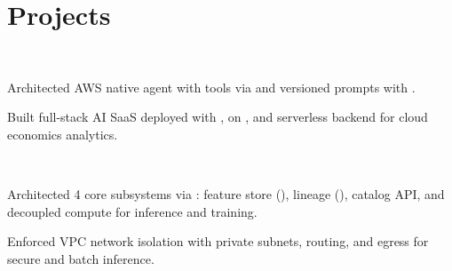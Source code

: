 \documentclass{tex/deedy-resume-openfont}
\begin{document}
\begin{minipage}[t]{0.67\textwidth}

\section{Projects}

\\
\begin{tightemize}
    \item Architected AWS native agent with tools via  and versioned prompts with .
    \item Built full-stack AI SaaS deployed with ,  on , and serverless backend for cloud economics analytics.
\end{tightemize}
\sectionsep

\\
\begin{tightemize}
    \item Architected 4 core subsystems via : feature store (), lineage (), catalog API, and decoupled compute for inference and training.
    \item Enforced VPC network isolation with private subnets,  routing, and  egress for secure  and batch inference.
\end{tightemize}

\end{minipage} 
\end{document}

